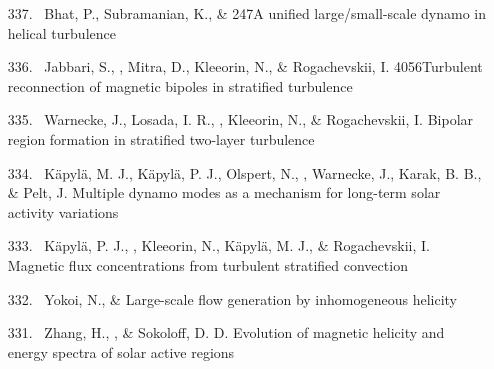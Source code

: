 \begin{itemize}
\item[{337.}~]
Bhat, P., Subramanian, K., \& \Brandenburg{}
{247}{A unified large/small-scale dynamo in helical turbulence}

\item[{336.}~]
Jabbari, S., \Brandenburg, Mitra, D., Kleeorin, N., \& Rogachevskii, I.
{4056}{Turbulent reconnection of magnetic bipoles in stratified turbulence}

\item[{335.}~]
Warnecke, J., Losada, I. R., \Brandenburg, Kleeorin, N., \& Rogachevskii, I.
{Bipolar region formation in stratified two-layer turbulence}

\item[{334.}~]
K\"apyl\"a, M. J., K\"apyl\"a, P. J., Olspert, N., \Brandenburg, Warnecke, J., Karak, B. B., \& Pelt, J.
{Multiple dynamo modes as a mechanism for long-term solar activity variations}

\item[{333.}~]
K\"apyl\"a, P. J., \Brandenburg, Kleeorin, N., K\"apyl\"a, M. J., \& Rogachevskii, I.
{Magnetic flux concentrations from turbulent stratified convection}

\item[{332.}~]
Yokoi, N., \& \Brandenburg{}
{Large-scale flow generation by inhomogeneous helicity}

\item[{331.}~]
Zhang, H., \Brandenburg, \& Sokoloff, D. D.
{Evolution of magnetic helicity and energy spectra of solar active regions}


\end{itemize}
